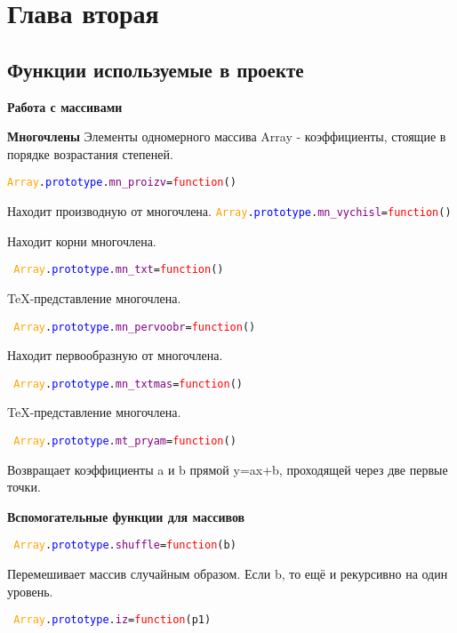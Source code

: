 \section{Глава вторая}
\subsection{Функции используемые в проекте}
\textbf{Работа с массивами}

\textbf{Многочлены}
Элементы одномерного массива Array - коэффициенты, стоящие в порядке возрастания степеней.

\texttt{\textcolor{Orange}{Array}.\textcolor{Blue}{prototype}.\textcolor{Purple}{mn\_proizv}=\textcolor{Red}{function}()}

Находит производную от многочлена.
\texttt{\textcolor{Orange}{Array}.\textcolor{Blue}{prototype}.\textcolor{Purple}{mn\_vychisl}=\textcolor{Red}{function}()}

Находит корни многочлена.

\texttt{
\textcolor{Orange}{Array}.\textcolor{Blue}{prototype}.\textcolor{Purple}{mn\_txt}=\textcolor{Red}{function}()}

TeX-представление многочлена.%

\texttt{
	\textcolor{Orange}{Array}.\textcolor{Blue}{prototype}.\textcolor{Purple}{mn\_pervoobr}=\textcolor{Red}{function}()
}

Находит первообразную от многочлена.%

\texttt{
	\textcolor{Orange}{Array}.\textcolor{Blue}{prototype}.\textcolor{Purple}{mn\_txtmas}=\textcolor{Red}{function}()
}

TeX-представление многочлена.

\texttt{
	\textcolor{Orange}{Array}.\textcolor{Blue}{prototype}.\textcolor{Purple}{mt\_pryam}=\textcolor{Red}{function}()
}

Возвращает коэффициенты a и b прямой y=ax+b, проходящей через две первые точки.

\textbf{Вспомогательные функции для массивов}

\texttt{
	\textcolor{Orange}{Array}.\textcolor{Blue}{prototype}.\textcolor{Purple}{shuffle}=\textcolor{Red}{function}(b)
}

Перемешивает массив случайным образом. Если b, то ещё и рекурсивно на один уровень.

\texttt{
	\textcolor{Orange}{Array}.\textcolor{Blue}{prototype}.\textcolor{Purple}{iz}=\textcolor{Red}{function}(p1)
}

